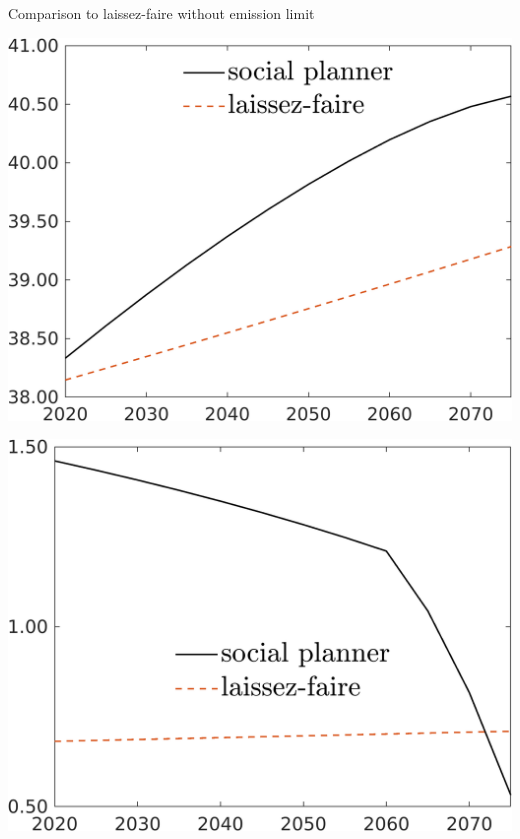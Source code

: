 \documentclass[11pt,aspectratio=169]{beamer}
\begin{document}
\begin{frame}{Comparison to laissez-faire without emission limit}
\begin{minipage}[]{0.32\textwidth}
	\includegraphics[width=1\textwidth]{../codding_model/own_basedOnFried/optimalPol_elastS_DisuSci/figures/all_1705/A_LFCompSP_NOT_spillover0_noskill1_sep1_BN0_ineq0_red0_xgrowth0_etaa0.79_lgd1.png}
\end{minipage}
\begin{minipage}[]{0.32\textwidth}
	\includegraphics[width=1\textwidth]{../codding_model/own_basedOnFried/optimalPol_elastS_DisuSci/figures/all_1705/S_LFCompSP_NOT_spillover0_noskill1_sep1_BN0_ineq0_red0_xgrowth0_etaa0.79_lgd1.png}
\end{minipage}
\begin{minipage}[]{0.32\textwidth}

\end{minipage}
\end{frame}
\end{document}
